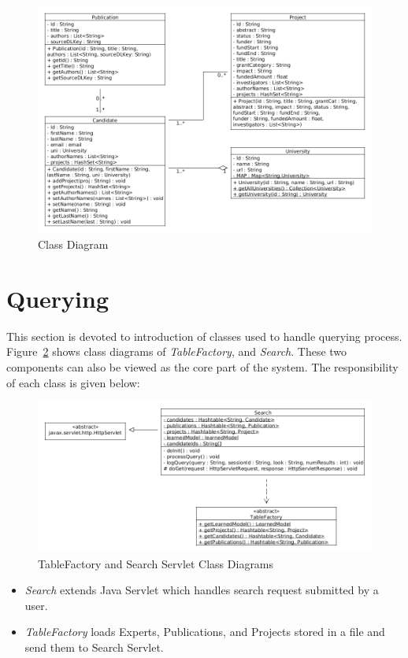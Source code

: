 \begin{figure}
\centering
\includegraphics[scale=0.4]{./figures/classDiagram1.png}
\caption{Class Diagram} \label{fig:classDiagram1} 
\end{figure}

\section{Querying}\label{sec:queryingImpl}
This section is devoted to introduction of classes used to handle querying process. Figure~\ref{fig:tableFactory} shows class diagrams of \textit{TableFactory}, and \textit{Search}. These two components can also be viewed as the core
part of the system. The responsibility of each class is given below:
\begin{figure}
\centering
\includegraphics[scale=0.4]{./figures/tablefactory.png}
\caption{TableFactory and Search Servlet Class Diagrams} \label{fig:tableFactory} 
\end{figure}


\begin{itemize}
 \item \textit{Search} extends Java Servlet which handles search request submitted by a user.
 \item \textit{TableFactory} loads Experts, Publications, and Projects stored in a file and send them to Search Servlet.
\end{itemize}

